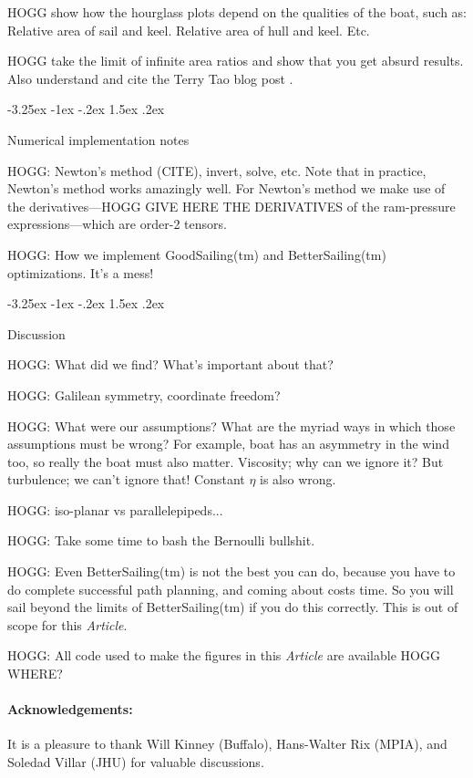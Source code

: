 \documentclass[letterpaper]{article}
\makeatletter
\newcommand{\documentname}{\textsl{Article}}
\renewcommand\section{\@startsection {section}{1}{\z@}%
  {-3.25ex \@plus -1ex \@minus -.2ex}%
  {1.5ex \@plus .2ex}%
  {\raggedright\normalfont\large\bfseries}}
\makeatother
\begin{document}
HOGG show how the hourglass plots depend on the qualities of the boat, such as: Relative area of sail and keel. Relative area of hull and keel. Etc.

HOGG take the limit of infinite area ratios and show that you get absurd results. Also understand and cite the Terry Tao blog post \cite{tao}.

\section{Numerical implementation notes}\label{sec:implementation}

HOGG: Newton's method (CITE), invert, solve, etc.
Note that in practice, Newton's method works amazingly well.
For Newton's method we make use of the derivatives---HOGG GIVE HERE THE DERIVATIVES of the ram-pressure expressions---which are order-2 tensors.

HOGG: How we implement GoodSailing(tm) and BetterSailing(tm) optimizations. It's a mess!

\section{Discussion}\label{sec:discussion}

HOGG: What did we find? What's important about that?

HOGG: Galilean symmetry, coordinate freedom?

HOGG: What were our assumptions? What are the myriad ways in which those assumptions must be wrong? For example, boat has an asymmetry in the wind too, so really the boat must also matter. Viscosity; why can we ignore it? But turbulence; we can't ignore that! Constant $\eta$ is also wrong.

HOGG: iso-planar vs parallelepipeds...

HOGG: Take some time to bash the Bernoulli bullshit.

HOGG: Even BetterSailing(tm) is not the best you can do, because you have to do complete successful path planning, and coming about costs time. So you will sail beyond the limits of BetterSailing(tm) if you do this correctly. This is out of scope for this \documentname.

HOGG: All code used to make the figures in this \documentname{} are available HOGG WHERE?

\paragraph{Acknowledgements:}
It is a pleasure to thank Will Kinney (Buffalo), Hans-Walter Rix (MPIA), and Soledad Villar (JHU) for valuable discussions.

\raggedright
\printbibliography
\end{document}
